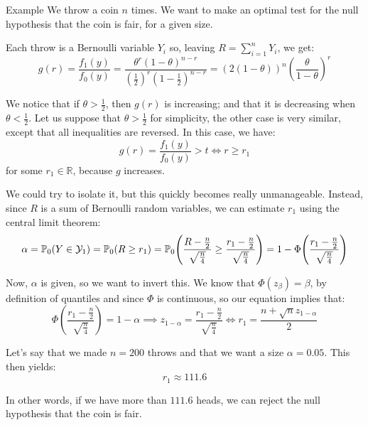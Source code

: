 \documentclass[a4paper]{article}
\begin{document}
\begin{parag}{Example}
    We throw a coin $n$ times. We want to make an optimal test for the null hypothesis that the coin is fair, for a given size.

    Each throw is a Bernoulli variable $Y_i$ so, leaving $R = \sum_{i=1}^{n} Y_i$, we get:
    \[g\left(r\right) = \frac{f_1\left(y\right)}{f_0\left(y\right)} = \frac{\theta^r \left(1 - \theta\right)^{n-r}}{\left(\frac{1}{2}\right)^r\left(1 - \frac{1}{2}\right)^{n-r}} = \left(2\left(1 - \theta\right)\right)^n \left(\frac{\theta}{1 - \theta}\right)^r\]

    We notice that if $\theta > \frac{1}{2}$, then $g\left(r\right)$ is increasing; and that it is decreasing when $\theta < \frac{1}{2}$. Let us suppose that $\theta > \frac{1}{2}$ for simplicity, the other case is very similar, except that all inequalities are reversed. In this case, we have:
    \[g\left(r\right) = \frac{f_1\left(y\right)}{f_0\left(y\right)} > t \iff r \geq r_1\]
    for some $r_1 \in \mathbb{R}$, because $g$ increases.

    We could try to isolate it, but this quickly becomes really unmanageable. Instead, since $R$ is a sum of Bernoulli random variables, we can estimate $r_1$ using the central limit theorem: 
    \[\alpha = \prob_0\left(Y \in \mathcal{Y}_1\right) = \prob_0\left(R \geq r_1\right) = \prob_0\left(\frac{R - \frac{n}{2}}{\sqrt{\frac{n}{4}}} \geq \frac{r_1 - \frac{n}{2}}{\sqrt{\frac{n}{4}}}\right) = 1 - \Phi\left(\frac{r_1 - \frac{n}{2}}{\sqrt{\frac{n}{4}}}\right)\]

    Now, $\alpha$ is given, so we want to invert this. We know that $\Phi\left(z_{\beta}\right) = \beta$, by definition of quantiles and since $\Phi$ is continuous, so our equation implies that: 
    \[\Phi\left(\frac{r_1 - \frac{n}{2}}{\sqrt{\frac{n}{4}}}\right) = 1 -\alpha \implies z_{1-\alpha} = \frac{r_1 - \frac{n}{2}}{\sqrt{\frac{n}{4}}} \iff r_1 = \frac{n + \sqrt{n} z_{1-\alpha}}{2}\]
    
    Let's say that we made $n = 200$ throws and that we want a size $\alpha = 0.05$. This then yields: 
    \[r_1 \approx 111.6\]

    In other words, if we have more than $111.6$ heads, we can reject the null hypothesis that the coin is fair.
\end{parag}
\end{document}
